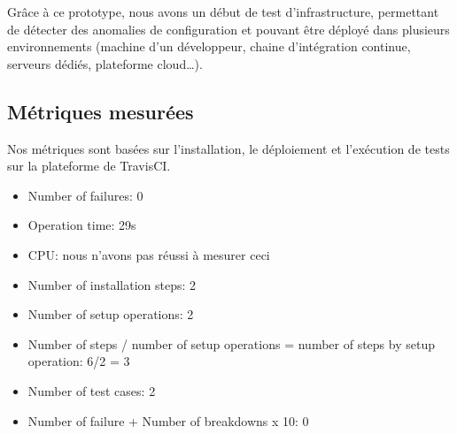     Grâce à ce prototype, nous avons un début de test d'infrastructure, permettant de détecter des anomalies de configuration et pouvant être déployé dans plusieurs environnements (machine d'un développeur, chaine d'intégration continue, serveurs dédiés, plateforme cloud\dots).

\subsection{Métriques mesurées}
    Nos métriques sont basées sur l'installation, le déploiement et l'exécution de tests sur la plateforme de TravisCI.
    \begin{itemize}
        \item Number of failures: 0
        \item Operation time: 29s
        \item CPU: nous n'avons pas réussi à mesurer ceci
        \item Number of installation steps: 2
        \item Number of setup operations: 2
        \item Number of steps / number of setup operations = number of steps by setup operation: 6/2 = 3
        \item Number of test cases: 2
        \item Number of failure + Number of breakdowns x 10: 0
    \end{itemize}
